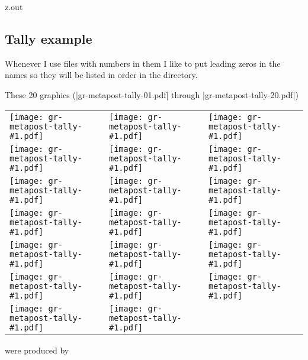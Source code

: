 \begin{VerbatimOut}{z.out}

\subsection{Tally example}
\label{ss:tally-example}

Whenever I use files with numbers in them I like to put leading zeros
in the names so they will be listed in order in the directory.

These 20 graphics (|gr-metapost-tally-01.pdf| through |gr-metapost-tally-20.pdf|)

\vspace*{6pt}

{%
  \def\g#1/{\texttt{[image: gr-metapost-tally-\#1.pdf]}}%

  \begin{tabular*}{\textwidth}{@{\kern2\parindent}@{\extracolsep{\fill}}lll@{\kern2\parindent}}%
    \g 01/& \g 02/& \g 03/\\
    \g 04/& \g 05/& \g 06/\\
    \g 07/& \g 08/& \g 09/\\
    \g 10/& \g 11/& \g 12/\\
    \g 13/& \g 14/& \g 15/\\
    \g 16/& \g 17/& \g 18/\\
    \g 19/& \g 20/\\
  \end{tabular*}%
}
\noindent were produced by


\end{VerbatimOut}

\MyIO


